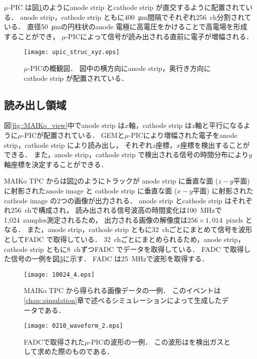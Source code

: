 \documentclass[../master]{subfiles}
\begin{document}
$\mu$-PIC は図\ref{fig::mupic}のようにanode strip とcathode strip が直交するように配置されている．
anode strip，cathode strip ともに\SI{400}{\micro\metre}間隔でそれぞれ256~ch分割されている．
直径\SI{50}{\micro\metre}の円柱状のanode 電極に高電圧をかけることで高電場を形成することができ，
$\mu$-PICによって信号が読み出される直前に電子が増幅される．
\begin{figure}
  \centering
  \texttt{[image: upic\_struc\_xyz.eps]}
  \caption[$\mu$-PICの概観図．]{$\mu$-PICの概観図．
    図中の横方向にanode strip，奥行き方向にcathode strip が配置されている．
  }
  \label{fig::mupic}
\end{figure}

\subsection{読み出し領域}
\label{sec::mu-pic}
図\ref{fig::MAIKo_view}中でanode strip は$x$軸，cathode strip は$z$軸と平行になるように$\mu$-PICが配置されている．
GEMと$\mu$-PICにより増幅された電子をanode strip，cathode strip により読み出し，
それぞれ$z$座標，$x$座標を検出することができる．
また，anode strip，cathode strip で検出される信号の時間分布により$y$軸座標を決定することができる．

MAIKo TPC からは図\ref{fig::track_demo}のようにトラックが
anode strip に垂直な面 ($z-y$平面) に射影されたanode image と
cathode strip に垂直な面 ($x-y$平面) に射影されたcathode image の2つの画像が出力される．
anode strip とcathode strip はそれぞれ256~chで構成され，
読み出される信号波高の時間変化は\SI{100}{\mega\hertz}で1,024~samples測定されるため，
出力される画像の解像度は$256\times1,014$~pixels となる．
また，anode strip，cathode strip ともに32~chごとにまとめて信号を波形としてFADC で取得している．
32~chごとにまとめられるため，anode strip，cathode strip ともに8~chずつFADC でデータを取得している．
FADC で取得した信号の一例を図\ref{fig::FADC_waveform}に示す．
FADC は\SI{25}{\mega\hertz}で波形を取得する．
\begin{figure}
  \centering
  \texttt{[image: 10024\_4.eps]}
  \caption[MAIKo TPC から得られる画像データの一例．]
          {MAIKo TPC から得られる画像データの一例．
          このイベントは\ref{chap::simulation}章で述べるシミュレーションによって生成したデータである．}
  \label{fig::track_demo}
\end{figure}
\begin{figure}
  \centering
  \texttt{[image: 0210\_waveform\_2.eps]}
  \caption[FADCで取得された$\mu$-PICの波形の一例．]
          {FADCで取得された$\mu$-PICの波形の一例．
          この波形は\isoButaneHydro を検出ガスとして求めた際のものである．}
  \label{fig::FADC_waveform}
\end{figure}
\end{document}
